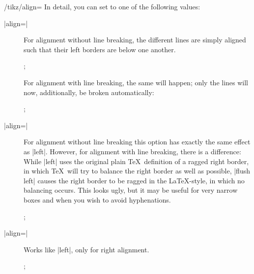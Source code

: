 \begin{key}{/tikz/align=}
    In detail, you can set  to one of the following values:
    \begin{description}
        \item[|align=|] For alignment without line breaking,
            the different lines are simply aligned such that their left borders
            are below one another.
\begin{codeexample}[]
\tikz {};
\end{codeexample}
            For alignment with line breaking, the same will happen; only the
            lines will now, additionally, be broken automatically:
\begin{codeexample}[]
\tikz {};
\end{codeexample}
        \item[|align=|] For alignment without line
            breaking this option has exactly the same effect as |left|.
            However, for alignment with line breaking, there is a difference:
            While |left| uses the original plain \TeX\ definition of a ragged
            right border, in which \TeX\ will try to balance the right border
            as well as possible, |flush left| causes the right border to be
            ragged in the \LaTeX-style, in which no balancing occurs. This
            looks ugly, but it may be useful for very narrow boxes and when you
            wish to avoid hyphenations.
\begin{codeexample}[]
\tikz {};
\end{codeexample}
        \item[|align=|] Works like |left|, only for right
            alignment.
\begin{codeexample}[]
\tikz {};
\end{codeexample}
\begin{codeexample}[]

\end{codeexample}
\end{description}
\end{key}
